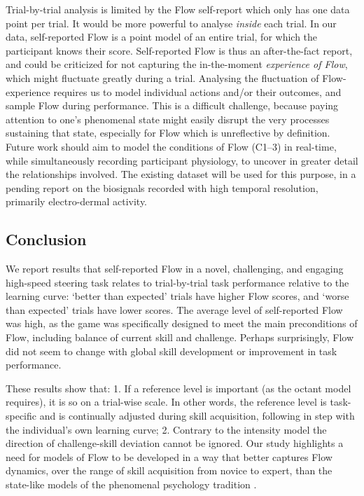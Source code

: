 \documentclass{frontierstyle/frontiersSCNS}
\newcommand{\hl}{\textcolor{red!80}}
\begin{document}
Trial-by-trial analysis is limited by the Flow self-report which only has one data point per trial. It would be more powerful to analyse {\it inside} each trial. In our data, self-reported Flow is a point model of an entire trial, for which the participant knows their score. Self-reported Flow is thus an after-the-fact report, and could be criticized for not capturing the in-the-moment {\it experience of Flow}, which might fluctuate greatly during a trial. Analysing the fluctuation of Flow-experience requires us to model individual actions and/or their outcomes, and sample Flow during performance. This is a difficult challenge, because paying attention to one's phenomenal state might easily disrupt the very processes sustaining that state, especially for Flow which is unreflective by definition. Future work should aim to model the conditions of Flow ({\sf C1--3}) in real-time, while simultaneously recording participant physiology, to uncover in greater detail the relationships involved. The existing dataset will be used for this purpose, in a pending report on the biosignals recorded with high temporal resolution, primarily electro-dermal activity.


\subsection{Conclusion}

We report results that self-reported Flow in a novel, challenging, and engaging high-speed steering task relates to trial-by-trial task performance relative to the learning curve: `better than expected' trials have higher Flow scores, and `worse than expected' trials have lower scores. The average level of self-reported Flow was high, as the game was specifically designed to meet the main preconditions of Flow, including balance of current skill and challenge. Perhaps surprisingly, Flow did not seem to change with global skill development or improvement in task performance.

\hl{These results show that: 1. If a reference level is important (as the octant model requires), it is so on a trial-wise scale. In other words, the reference level is task-specific and is continually adjusted during skill acquisition, following in step with the individual's own learning curve; 2. Contrary to the intensity model \citep{Keller2012} the direction of challenge-skill deviation cannot be ignored. Our study highlights a need for models of Flow to be developed in a way that better captures Flow dynamics, over the range of skill acquisition from novice to expert, than the state-like models of the phenomenal psychology tradition \citep{Moneta2012}.}
\end{document}
